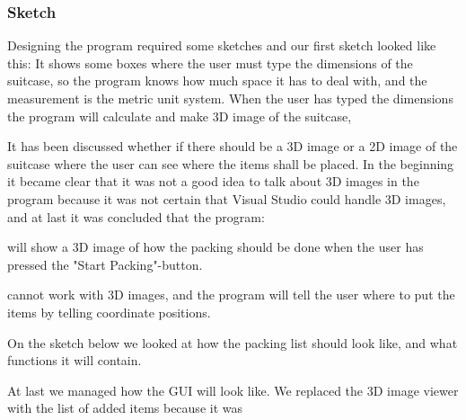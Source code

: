 \subsubsection{Sketch}

Designing the program required some sketches and our first sketch looked like this:
It shows some boxes where the user must type the dimensions of the suitcase, so the program knows how much space it has to deal with, and the measurement is the metric unit system.
When the user has typed the dimensions the program will calculate and make 3D image of the suitcase, 


It has been discussed whether if there should be a 3D image or a 2D image of the suitcase where the user can see where the items shall be placed. In the beginning it became clear that it was not a good idea to talk about 3D images in the program because it was not certain that Visual Studio could handle 3D images, and at last it was concluded that the program:

will show a 3D image of how the packing should be done when the user has pressed the "Start Packing"-button.

cannot work with 3D images, and the program will tell the user where to put the items by telling coordinate positions.



On the sketch below we looked at how the packing list should look like, and what functions it will contain.


At last we managed how the GUI will look like. We replaced the 3D image viewer with the list of added items because it was 




